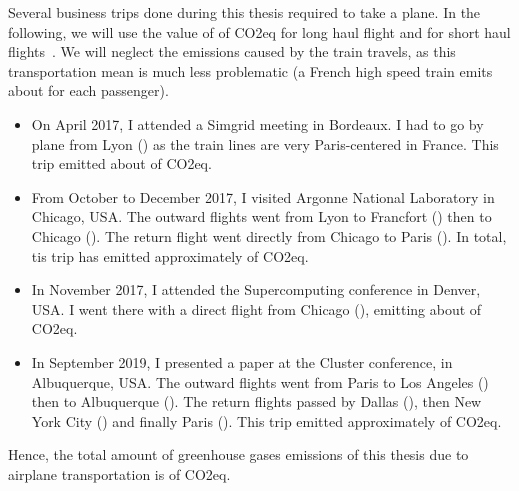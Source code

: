     Several business trips done during this thesis required to take a plane. In the following, we will use the value of
     of CO2eq for long haul flight and  for short haul
    flights~\cite{co2_flight}. We will neglect the emissions caused by the train travels, as this transportation mean is
    much less problematic (a French high speed train emits about  for each passenger).
    \begin{itemize}
        \item On April 2017, I attended a Simgrid meeting in Bordeaux. I had to go by plane from Lyon
            () as the train lines are very Paris-centered in France. This trip emitted
            about  of CO2eq.
        \item From October to December 2017, I visited Argonne National Laboratory in Chicago, USA. The outward flights
            went from Lyon to Francfort () then to Chicago ().
            The return flight went directly from Chicago to Paris ().  In total, tis trip has
            emitted approximately  of CO2eq.
        \item In November 2017, I attended the Supercomputing conference in Denver, USA. I went there with a direct
            flight from Chicago (), emitting about  of CO2eq.
        \item In September 2019, I presented a paper at the Cluster conference, in Albuquerque, USA. The outward flights
            went from Paris to Los Angeles () then to Albuquerque (). The
            return flights passed by Dallas (), then New York City ()
            and finally Paris (). This trip emitted approximately  of CO2eq.
    \end{itemize}
    Hence, the total amount of greenhouse gases emissions of this thesis due to airplane transportation is
     of CO2eq.
